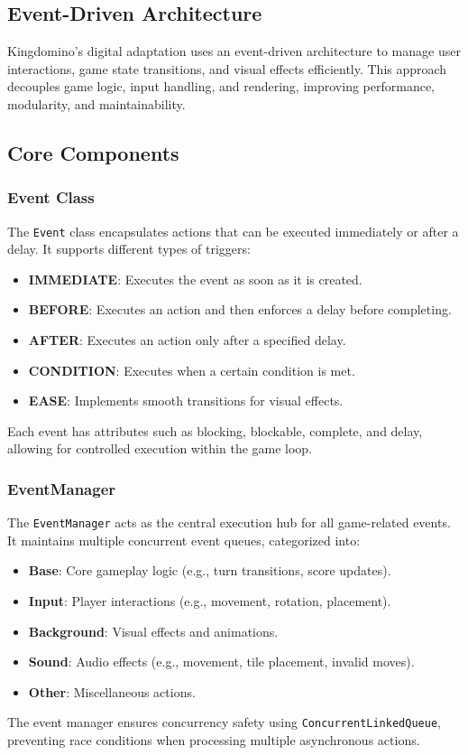 \documentclass[conference]{IEEEtran}
\begin{document}
\subsection{Event-Driven Architecture}

Kingdomino’s digital adaptation uses an event-driven architecture to manage
user interactions, game state transitions, and visual effects efficiently. This
approach decouples game logic, input handling, and rendering, improving
performance, modularity, and maintainability.

\subsection{Core Components}
\subsubsection{Event Class}
The \texttt{Event} class encapsulates actions that can be executed immediately
or after a delay. It supports different types of triggers:
\begin{itemize}
    \item \textbf{IMMEDIATE}: Executes the event as soon as it is created.
    \item \textbf{BEFORE}: Executes an action and then enforces a delay before completing.
    \item \textbf{AFTER}: Executes an action only after a specified delay.
    \item \textbf{CONDITION}: Executes when a certain condition is met.
    \item \textbf{EASE}: Implements smooth transitions for visual effects.
\end{itemize}
Each event has attributes such as blocking, blockable, complete, and delay, allowing for controlled execution within the game loop.

\subsubsection{EventManager}
The \texttt{EventManager} acts as the central execution hub for all
game-related events. It maintains multiple concurrent event queues, categorized
into:
\begin{itemize}
    \item \textbf{Base}: Core gameplay logic (e.g., turn transitions, score updates).
    \item \textbf{Input}: Player interactions (e.g., movement, rotation, placement).
    \item \textbf{Background}: Visual effects and animations.
    \item \textbf{Sound}: Audio effects (e.g., movement, tile placement, invalid moves).
    \item \textbf{Other}: Miscellaneous actions.
\end{itemize}
The event manager ensures concurrency safety using \texttt{ConcurrentLinkedQueue}, preventing race conditions when processing multiple asynchronous actions.
\end{document}
